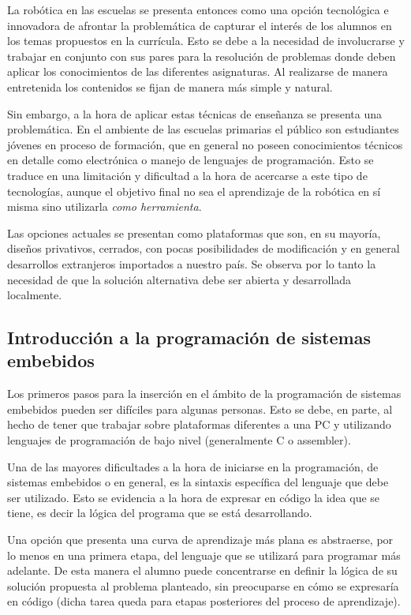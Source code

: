 La robótica en las escuelas se presenta entonces como una opción tecnológica e innovadora de afrontar la problemática de capturar el interés de los alumnos en los temas propuestos en la currícula. Esto se debe a la necesidad de involucrarse y trabajar en conjunto con sus pares para la resolución de problemas donde deben aplicar los conocimientos de las diferentes asignaturas. Al realizarse de manera entretenida los contenidos se fijan de manera más simple y natural.

Sin embargo, a la hora de aplicar estas técnicas de enseñanza se presenta una problemática. En el ambiente de las escuelas  primarias el público son estudiantes jóvenes en proceso de formación, que en general no poseen conocimientos técnicos en detalle como electrónica o manejo de lenguajes de programación. Esto se traduce en una limitación y dificultad a la hora de acercarse a este tipo de tecnologías, aunque el objetivo final no sea el aprendizaje de la robótica en sí misma sino utilizarla \textit{como herramienta}.

Las opciones actuales se presentan como plataformas que son, en su mayoría, diseños privativos, cerrados, con pocas posibilidades de modificación y en general desarrollos extranjeros importados a nuestro país. Se observa por lo tanto la necesidad de que la solución alternativa debe ser abierta y desarrollada localmente.

\subsection{Introducción a la programación de sistemas embebidos}
Los primeros pasos para la inserción en el ámbito de la programación de sistemas embebidos pueden ser difíciles para algunas personas. Esto se debe, en parte, al hecho de tener que trabajar sobre plataformas diferentes a una PC y utilizando lenguajes de programación de bajo nivel (generalmente C o assembler).

Una de las mayores dificultades a la hora de iniciarse en la programación, de sistemas embebidos o en general, es la sintaxis específica del lenguaje que debe ser utilizado. Esto se evidencia a la hora de expresar en código la idea que se tiene, es decir la lógica del programa que se está desarrollando.

Una opción que presenta una curva de aprendizaje más plana es abstraerse, por lo menos en una primera etapa, del lenguaje que se utilizará para programar más adelante. De esta manera el alumno puede concentrarse en definir la lógica de su solución propuesta al problema planteado, sin preocuparse en cómo se expresaría en código (dicha tarea queda para etapas posteriores del proceso de aprendizaje).

